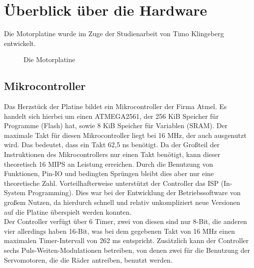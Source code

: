 \chapter{Überblick über die Hardware}

Die Motorplatine wurde im Zuge der Studienarbeit von Timo Klingeberg \cite{STUD_TIMO}
entwickelt.
\begin{figure}[htb]
 \centering
 \caption{\label{board}Die Motorplatine}
\end{figure}
\section{Mikrocontroller}
Das Herzstück der Platine bildet ein Mikrocontroller der Firma Atmel.
Es handelt sich hierbei um einen ATMEGA2561\cite{ATMEGA_MANUAL}, der 256 KiB Speicher für
Programme (Flash) hat, sowie 8 KiB Speicher für Variablen (SRAM). Der maximale Takt für
diesen Mikrocontroller liegt bei 16 MHz, der auch ausgenutzt wird. Das bedeutet, dass
ein Takt 62,5 ns benötigt. Da der Großteil der Instruktionen des Mikrocontrollers nur
einen Takt benötigt, kann dieser theoretisch 16 MIPS an Leistung erreichen. Durch die Benutzung
von Funktionen, Pin-IO und bedingten Sprüngen bleibt dies aber nur eine theoretische Zahl.
Vorteilhafterweise unterstützt der Controller das ISP (In-System Programming). Dies war bei der
Entwicklung der Betriebssoftware von großem Nutzen, da hierdurch schnell und relativ
unkompliziert neue Versionen auf die Platine überspielt werden konnten.\\
Der Controller verfügt über 6 Timer, zwei von diesen sind nur 8-Bit, die anderen vier allerdings
haben 16-Bit, was bei dem gegebenen Takt von 16 MHz einen maximalen Timer-Intervall von 262 ms
entspricht. Zusätzlich kann der Controller sechs Puls-Weiten-Modulationen betreiben, von
denen zwei für die Benutzung der Servomotoren, die die Räder antreiben, benutzt werden.
